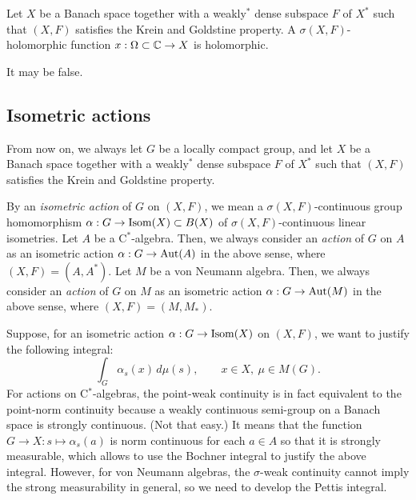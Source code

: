 \documentclass{../../small}
\begin{document}
\begin{prop}
Let $X$ be a Banach space together with a weakly$^*$ dense subspace $F$ of $X^*$ such that $(X,F)$ satisfies the Krein and Goldstine property.
A $\sigma(X,F)$-holomorphic function $x:\Omega\subset\mathbb{C}\to X$ is holomorphic.
\end{prop}
\begin{pf}
It may be false.
\end{pf}


\subsection{Isometric actions}

From now on, we always let $G$ be a locally compact group, and let $X$ be a Banach space together with a weakly$^*$ dense subspace $F$ of $X^*$ such that $(X,F)$ satisfies the Krein and Goldstine property.



\begin{defn}
By an \emph{isometric action} of $G$ on $(X,F)$, we mean a $\sigma(X,F)$-continuous group homomorphism $\alpha:G\to\operatorname{Isom}(X)\subset B(X)$ of $\sigma(X,F)$-continuous linear isometries.
Let $A$ be a C$^*$-algebra.
Then, we always consider an \emph{action} of $G$ on $A$ as an isometric action $\alpha:G\to\operatorname{Aut}(A)$ in the above sense, where $(X,F)=(A,A^*)$.
Let $M$ be a von Neumann algebra.
Then, we always consider an \emph{action} of $G$ on $M$ as an isometric action $\alpha:G\to\operatorname{Aut}(M)$ in the above sense, where $(X,F)=(M,M_*)$.
\end{defn}

\begin{rmk*}
Suppose, for an isometric action $\alpha:G\to\operatorname{Isom}(X)$ on $(X,F)$, we want to justify the following integral:
\[\int_G\alpha_s(x)\,d\mu(s),\qquad x\in X,\ \mu\in M(G).\]
For actions on C$^*$-algebras, the point-weak continuity is in fact equivalent to the point-norm continuity because a weakly continuous semi-group on a Banach space is strongly continuous. (Not that easy.)
It means that the function $G\to X:s\mapsto\alpha_s(a)$ is norm continuous for each $a\in A$ so that it is strongly measurable, which allows to use the Bochner integral to justify the above integral.
However, for von Neumann algebras, the $\sigma$-weak continuity cannot imply the strong measurability in general, so we need to develop the Pettis integral.
\end{rmk*}
\end{document}
